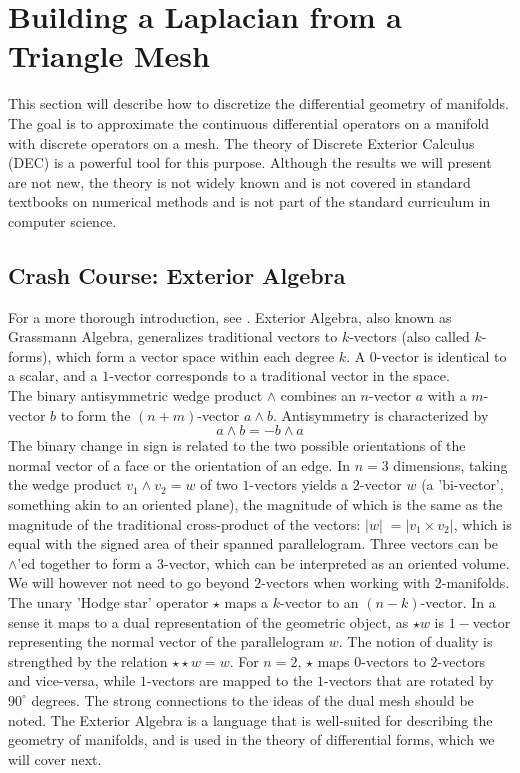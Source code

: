 \section*{Building a Laplacian from a Triangle Mesh}
This section will describe how to discretize the differential geometry of manifolds. The goal is to approximate the continuous differential operators on a manifold with discrete operators on a mesh. The theory of Discrete Exterior Calculus (DEC) is a powerful tool for this purpose. Although the results we will present are not new, the theory is not widely known and is not covered in standard textbooks on numerical methods and is not part of the standard curriculum in computer science.

\subsection*{Crash Course: Exterior Algebra}
For a more thorough introduction, see \cite{craneDDG}.
Exterior Algebra, also known as Grassmann Algebra, generalizes traditional vectors to $k$-vectors (also called $k$-forms), which form a vector space within each degree $k$. A $0$-vector is identical to a scalar, and a $1$-vector corresponds to a traditional vector in the space.
\\
The binary antisymmetric wedge product $\wedge$ combines an $n$-vector $a$ with a $m$-vector $b$ to form the $(n+m)$-vector $a \wedge b$. Antisymmetry is characterized by $$a \wedge b = -b \wedge a$$
The binary change in sign is related to the two possible orientations of the normal vector of a face or the orientation of an edge. In $n=3$ dimensions, taking the wedge product $v_1 \wedge v_2 = w$ of two $1$-vectors yields a $2$-vector $w$ (a 'bi-vector', something akin to an oriented plane), the magnitude of which is the same as the magnitude of the traditional cross-product of the vectors: $|w| \;= |v_1 \times v_2|$, which is equal with the signed area of their spanned parallelogram. Three vectors can be $\wedge$'ed together to form a $3$-vector, which can be interpreted as an oriented volume. We will however not need to go beyond $2$-vectors when working with 2-manifolds.
\\
The unary 'Hodge star' operator $\star$ maps a $k$-vector to an $(n-k)$-vector. In a sense it maps to a dual representation of the geometric object, as $\star w$ is $1-$vector representing the normal vector of the parallelogram $w$. The notion of duality is strengthed by the relation $\star\star w = w$. For $n=2$, $\star$ maps $0$-vectors to $2$-vectors and vice-versa, while $1$-vectors are mapped to the $1$-vectors that are rotated by $90^\circ$ degrees. The strong connections to the ideas of the dual mesh should be noted. The Exterior Algebra is a language that is well-suited for describing the geometry of manifolds, and is used in the theory of differential forms, which we will cover next.

